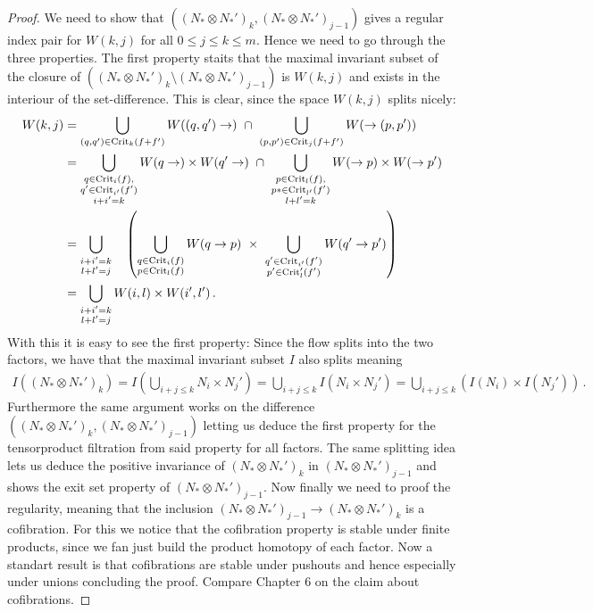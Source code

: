 \begin{proof}
	We need to show that $\left((N_*\otimes N_*')_k,(N_*\otimes N_*')_{j-1}\right)$ gives a regular index pair for $W(k,j)$ for all $0\leq j\leq k\leq m$. Hence we need to go through the three properties. The first property staits that the maximal invariant subset of the closure of $\left((N_*\otimes N_*')_k\setminus (N_*\otimes N_*')_{j-1}\right)$ is $W(k,j)$ and exists in the interiour of the set-difference. This is clear, since the space $W(k,j)$ splits nicely:
	\begin{align*}
		W(k,j)&=\bigcup _{(q,q')\in \mathrm{Crit}_{k}(f+f')}W((q,q')\to)~\cap~ \bigcup _{(p,p')\in \mathrm{Crit}_{j}(f+f')}W(\to (p,p'))\\
		&=\bigcup_{\substack{q\in \mathrm{Crit}_i(f),\\ q'\in \mathrm{Crit}_{i'}(f')\\ i+i'=k}}W(q\to)\times W(q'\to)
		~\cap~ 
		\bigcup _{\substack{p\in \mathrm{Crit}_l(f),\\ p*\in \mathrm{Crit}_{l'}(f')\\l+l'=k}}W(\to p)\times W(\to p')\\
		&=\bigcup_{\substack{i+i'=k\\l+l'=j}} \quad \left(\bigcup_{\substack{q\in \mathrm{Crit}_{i}(f)\\ p\in \mathrm{Crit}_l(f)}}W(q\to p) 
		 ~\times ~
		 \bigcup_{\substack{q'\in \mathrm{Crit}_{i'}(f')\\ p'\in \mathrm{Crit}_l'(f')}}W(q'\to p') \right)\\
		 &=\bigcup_{\substack{i+i'=k\\l+l'=j}} W(i,l)\times W(i',l')\,.
	\end{align*}
	With this it is easy to see the first property: Since the flow splits into the two factors, we have that the maximal invariant subset $I$ also splits meaning 
	\begin{align*}
		I\left((N_*\otimes N_*')_k \right)
		=I(\bigcup_{i+j\leq k}N_i\times N_{j}')
		=\bigcup_{i+j\leq k}I(N_i\times N_{j}')
		=\bigcup_{i+j\leq k}(I(N_i)\times I(N_{j}'))\,.
	\end{align*}Furthermore the same argument works on the difference $\left((N_*\otimes N_*')_k,(N_*\otimes N_*')_{j-1}\right)$ letting us deduce the first property for the tensorproduct filtration from said property for all factors. 
	The same splitting idea lets us deduce the positive invariance of $(N_*\otimes N_*')_k$ in $(N_*\otimes N_*')_{j-1}$ and shows the exit set property of $(N_*\otimes N_*')_{j-1}$. Now finally we need to proof the regularity, meaning that the inclusion $(N_*\otimes N_*')_{j-1}\to (N_*\otimes N_*')_k$ is a cofibration. For this we notice that the cofibration property is stable under finite products, since we fan just build the product homotopy of each factor. Now a standart result is that cofibrations are stable under pushouts and hence especially under unions concluding the proof. Compare \cite{May1999} Chapter 6 on the claim about cofibrations.
\end{proof}
